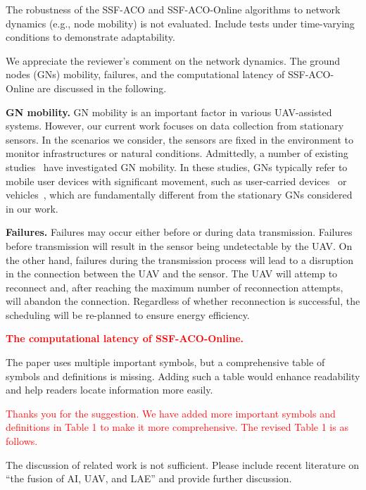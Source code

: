 \begin{revcomment}
	The robustness of the SSF-ACO and SSF-ACO-Online algorithms to network dynamics (e.g., node mobility) is not evaluated. Include tests under time-varying conditions to demonstrate adaptability.
\end{revcomment}
\begin{revresponse}
	We appreciate the reviewer's comment on the network dynamics.
	The ground nodes (GNs) mobility, failures, and the computational latency of SSF-ACO-Online are discussed in the following.

	\textbf{GN mobility.}
	GN mobility is an important factor in various UAV-assisted systems.
	However, our current work focuses on data collection from stationary sensors.
	In the scenarios we consider, the sensors are fixed in the environment to monitor infrastructures or natural conditions.
	Admittedly, a number of existing studies~\cite{GNmob1, GNmob2, GNmob3, GNmob4} have investigated GN mobility.
	In these studies, GNs typically refer to mobile user devices with significant movement, such as user-carried devices~\cite{GNmob1,GNmob2} or vehicles~\cite{GNmob3,GNmob4}, which are fundamentally different from the stationary GNs considered in our work.

	\textbf{Failures.}
	Failures may occur either before or during data transmission.
	Failures before transmission will result in the sensor being undetectable by the UAV.
	On the other hand, failures during the transmission process will lead to a disruption in the connection between the UAV and the sensor.
	The UAV will attemp to reconnect and, after reaching the maximum number of reconnection attempts, will abandon the connection.
	Regardless of whether reconnection is successful, the scheduling will be re-planned to ensure energy efficiency.

	\textcolor{red}{\textbf{The computational latency of SSF-ACO-Online.}}
\end{revresponse}

\begin{revcomment}
	The paper uses multiple important symbols, but a comprehensive table of symbols and definitions is missing. Adding such a table would enhance readability and help readers locate information more easily.
\end{revcomment}
\begin{revresponse}
	\textcolor{red}{
	Thanks you for the suggestion. We have added more important symbols and definitions in Table 1 to make it more comprehensive. The revised Table 1 is as follows.
	}
	\begin{changes}
	\end{changes}
\end{revresponse}

\begin{revcomment}
	The discussion of related work is not sufficient. Please include recent literature on ``the fusion of AI, UAV, and LAE'' and provide further discussion.
\end{revcomment}
\begin{revresponse}
\end{revresponse}

